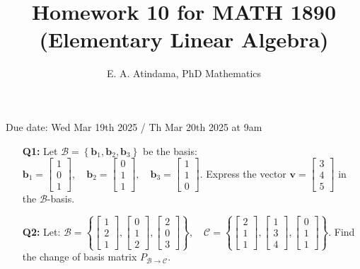\documentclass[a4paper,11pt,reqno]{amsart}
\title[MATH 1890 (Elementary Linear Algebra)]{Homework 10 for MATH 1890 (Elementary Linear Algebra)}
\author[Emmanuel Atindama]{E. A. Atindama, PhD Mathematics}
\numberwithin{equation}{section}
\begin{document}
\maketitle
Due date: Wed Mar 19th 2025 / Th Mar 20th 2025 at 9am
\vspace{0.5cm}

\begin{enumerate}
    \item[\textbf{Q1:}] 
    Let \( {\mathcal{B}} = \left\{ \mathbf{b}_1, \mathbf{b}_2, \mathbf{b}_3 \right\} \) be the basis: 
    \(
    \mathbf{b}_1 = \begin{bmatrix} 1 \\ 0 \\ 1 \end{bmatrix}, \quad
    \mathbf{b}_2 = \begin{bmatrix} 0 \\ 1 \\ 1 \end{bmatrix}, \quad
    \mathbf{b}_3 = \begin{bmatrix} 1 \\ 1 \\ 0 \end{bmatrix}.
    \)
    Express the vector \( \mathbf{v} = \begin{bmatrix} 3 \\ 4 \\ 5 \end{bmatrix} \) in the \( {\mathcal{B}} \)-basis.

    \item[\textbf{Q2:}]
    Let:
    \(
    {\mathcal{B}} = \left\{ \begin{bmatrix} 1 \\ 2 \\ 1 \end{bmatrix}, \begin{bmatrix} 0 \\ 1 \\ 2 \end{bmatrix}, \begin{bmatrix} 2 \\ 0 \\ 3 \end{bmatrix} \right\}, \quad
    {\mathcal{C}} = \left\{ \begin{bmatrix} 2 \\ 1 \\ 1 \end{bmatrix}, \begin{bmatrix} 1 \\ 3 \\ 4 \end{bmatrix}, \begin{bmatrix} 0 \\ 1 \\ 1 \end{bmatrix} \right\}.
    \)
    Find the change of basis matrix \( P_{{\mathcal{B}} \to {\mathcal{C}}} \).


\end{enumerate}
\end{document}
